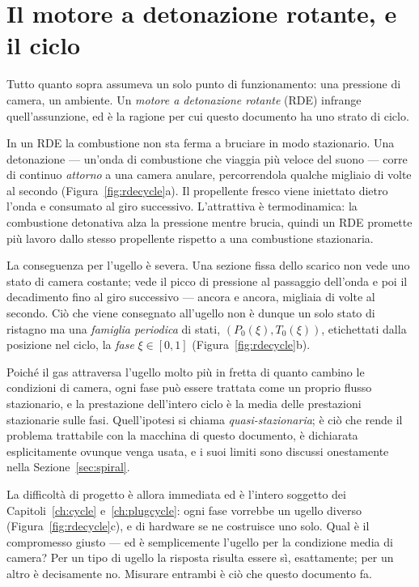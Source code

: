 \section{Il motore a detonazione rotante, e il ciclo}
\label{sec:rdeintro}

Tutto quanto sopra assumeva un solo punto di funzionamento: una
pressione di camera, un ambiente. Un \emph{motore a detonazione
rotante} (RDE) infrange quell'assunzione, ed è la ragione per cui
questo documento ha uno strato di ciclo.

In un RDE la combustione non sta ferma a bruciare in modo stazionario.
Una detonazione --- un'onda di combustione che viaggia più veloce
del suono --- corre di continuo \emph{attorno} a una camera anulare,
percorrendola qualche migliaio di volte al secondo
(Figura~\ref{fig:rdecycle}a). Il propellente fresco viene iniettato
dietro l'onda e consumato al giro successivo. L'attrattiva è
termodinamica: la combustione detonativa alza la pressione mentre
brucia, quindi un RDE promette più lavoro dallo stesso propellente
rispetto a una combustione stazionaria.

La conseguenza per l'ugello è severa. Una sezione fissa dello
scarico non vede uno stato di camera costante; vede il picco di
pressione al passaggio dell'onda e poi il decadimento fino al giro
successivo --- ancora e ancora, migliaia di volte al secondo. Ciò
che viene consegnato all'ugello non è dunque un solo stato di
ristagno ma una \emph{famiglia periodica} di stati,
$(P_0(\xi), T_0(\xi))$, etichettati dalla posizione nel ciclo, la
\emph{fase} $\xi \in [0,1]$ (Figura~\ref{fig:rdecycle}b).

Poiché il gas attraversa l'ugello molto più in fretta di quanto
cambino le condizioni di camera, ogni fase può essere trattata come
un proprio flusso stazionario, e la prestazione dell'intero ciclo è
la media delle prestazioni stazionarie sulle fasi. Quell'ipotesi si
chiama \emph{quasi-stazionaria}; è ciò che rende il problema
trattabile con la macchina di questo documento, è dichiarata
esplicitamente ovunque venga usata, e i suoi limiti sono discussi
onestamente nella Sezione~\ref{sec:spiral}.

La difficoltà di progetto è allora immediata ed è l'intero soggetto
dei Capitoli~\ref{ch:cycle} e~\ref{ch:plugcycle}: ogni fase
vorrebbe un ugello diverso (Figura~\ref{fig:rdecycle}c), e di
hardware se ne costruisce uno solo. Qual è il compromesso giusto ---
ed è semplicemente l'ugello per la condizione media di camera? Per
un tipo di ugello la risposta risulta essere sì, esattamente; per un
altro è decisamente no. Misurare entrambi è ciò che questo documento
fa.

